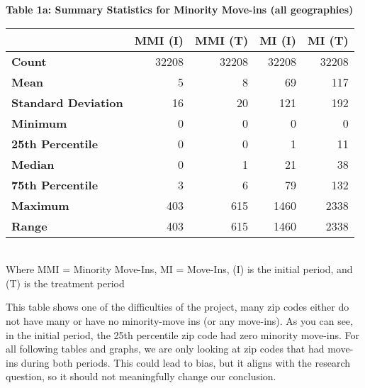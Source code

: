 \documentclass[11pt]{article}
\begin{document}
\begin{table}[H]
    \centering
    \textbf{Table 1a: Summary Statistics for Minority Move-ins (all geographies)}\\
    \begin{tabular}{l|rrrr}
    \toprule
    & \textbf{MMI (I)} & \textbf{MMI (T)} & \textbf{MI (I)} & \textbf{MI (T)} \\
    \midrule
    \textbf{Count} & 32208 & 32208 & 32208 & 32208 \\
    \textbf{Mean} & 5 & 8 & 69 & 117 \\
    \textbf{Standard Deviation} & 16 & 20 & 121 & 192 \\
    \textbf{Minimum} & 0 & 0 & 0 & 0 \\
    \textbf{25th Percentile} & 0 & 0 & 1 & 11 \\
    \textbf{Median} & 0 & 1 & 21 & 38 \\
    \textbf{75th Percentile} & 3 & 6 & 79 & 132 \\
    \textbf{Maximum} & 403 & 615 & 1460 & 2338 \\
    \textbf{Range} & 403 & 615 & 1460 & 2338 \\
    \bottomrule
    \end{tabular}\\
    Where MMI = Minority Move-Ins, MI = Move-Ins, (I) is the initial period, and (T) is the treatment period
\end{table}
        
    This table shows one of the difficulties of the project, many zip codes 
    either do not have many or have no minority-move ins (or any move-ins). As you can see, in
the initial period, the 25th percentile zip code had zero minority move-ins. For
all following tables and graphs, we are only looking at zip codes that
had move-ins during both periods. This could lead to bias, but it aligns
with the research question, so it should not meaningfully change our
conclusion.
\end{document}
